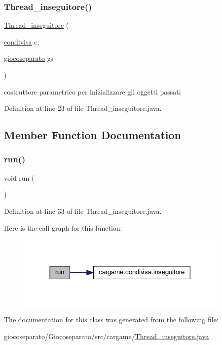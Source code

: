 \subsubsection{\texorpdfstring{Thread\+\_\+inseguitore()}{Thread\_inseguitore()}}
{\footnotesize\ttfamily \hyperlink{classcargame_1_1_thread__inseguitore}{Thread\+\_\+inseguitore} (\begin{DoxyParamCaption}\item[{\hyperlink{classcargame_1_1condivisa}{condivisa}}]{c,  }\item[{\hyperlink{classcargame_1_1giocoseparato}{giocoseparato}}]{gs }\end{DoxyParamCaption})}



costruttore parametrico per inizializzare gli oggetti passati 



Definition at line 23 of file Thread\+\_\+inseguitore.\+java.



\subsection{Member Function Documentation}
\mbox{\label{classcargame_1_1_thread__inseguitore_a13a43e6d814de94978c515cb084873b1}} 
\subsubsection{\texorpdfstring{run()}{run()}}
{\footnotesize\ttfamily void run (\begin{DoxyParamCaption}{ }\end{DoxyParamCaption})}



Definition at line 33 of file Thread\+\_\+inseguitore.\+java.

Here is the call graph for this function\+:
\nopagebreak
\begin{figure}[H]
\begin{center}
\leavevmode
\includegraphics[width=293pt]{classcargame_1_1_thread__inseguitore_a13a43e6d814de94978c515cb084873b1_cgraph}
\end{center}
\end{figure}


The documentation for this class was generated from the following file\+:\begin{DoxyCompactItemize}
\item 
giocoseparato/\+Giocoseparato/src/cargame/\hyperlink{_thread__inseguitore_8java}{Thread\+\_\+inseguitore.\+java}\end{DoxyCompactItemize}
